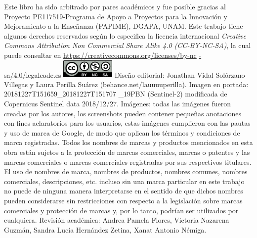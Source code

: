 \documentclass[
  12pt,
  letterpaper,
  twoside]{book}
\begin{document}
\setlength{\columnsep}{25pt}
\begin{multicols*}{2}
    \raggedcolumns
    {\scriptsize Este libro ha sido arbitrado por pares académicos y fue posible gracias al Proyecto PE117519-Programa de Apoyo a Proyectos para la Innovación y Mejoramiento a la Enseñanza (PAPIME), DGAPA, UNAM. 
    \linebreak Este trabajo tiene algunos derechos reservados según lo especifica la licencia internacional {\it Creative Commons Attribution Non Commercial Share Alike 4.0 (CC-BY-NC-SA)}, la cual puede consultar en \href{https://creativecommons.org/licenses/by-nc-sa/4.0/legalcode.es}{https://creativecommons.org/licenses/by-nc} \href{https://creativecommons.org/licenses/by-nc -sa/4.0/legalcode.es}{-sa/4.0/legalcode.es}
    \linebreak
    \begingroup
        \includegraphics[height=26pt]{Img/license}
    \endgroup
    \newline Diseño editorial: Jonathan Vidal Solórzano Villegas y Laura Perilla Suárez (behance.net/lauuuuperilla).
    \newline Imagen en portada: 20181227T151659\_20181227T151707 \_19PBN (Sentinel-2) modificada de Copernicus Sentinel data 2018/12/27. 
    \newline Imágenes: todas las imágenes fueron creadas por los autores, los screenshots pueden contener pequeñas anotaciones con fines aclaratorios para los usuarios, estas imágenes cumplieron con las pautas y uso de marca de Google, de modo que aplican los términos y condiciones de marca registradas. 
    \newline Todos los nombres de marcas y productos mencionados en esta obra están sujetos a la protección de marcas comerciales, marcas o patentes y las marcas comerciales o marcas comerciales registradas por sus respectivos titulares. 
    El uso de nombres de marca, nombres de productos, nombres comunes, nombres comerciales, descripciones, etc. incluso sin una marca particular en este trabajo no puede de ninguna manera interpretarse en el sentido de que dichos nombres pueden considerarse sin restricciones con respecto a la legislación sobre marcas comerciales y protección de marcas y, por lo tanto, podrían ser utilizados por cualquiera.
    \linebreak
    \newline Revisión académica: Andrea Pamela Flores, Victoria Nazarena Guzmán, Sandra Lucía Hernández Zetina, Xanat Antonio Némiga. \hspace*{\fill}
}
\end{multicols*}
\end{document}

